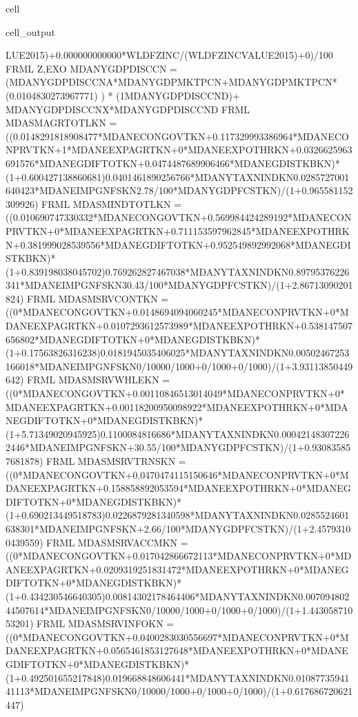 \documentclass[letterpaper,10pt,english]{jupyterBook}
\begin{document}
\begin{sphinxuseclass}{cell}
\begin{sphinxVerbatimOutput}
\begin{sphinxuseclass}{cell_output}
\begin{sphinxVerbatim}[commandchars=\\\{\}]
LUE\PYGZus{}2015)+0.000000000000*WLDFZINC/(WLDFZINC\PYGZus{}VALUE\PYGZus{}2015)+0)/100 \PYGZdl{}
FRML \PYGZlt{}Z,EXO\PYGZgt{} MDANYGDPDISCCN = (MDANYGDPDISCCN\PYGZus{}A*MDANYGDPMKTPCN+MDANYGDPMKTPCN* (\PYGZhy{}0.0104830273967771) ) * (1\PYGZhy{}MDANYGDPDISCCN\PYGZus{}D)+ MDANYGDPDISCCN\PYGZus{}X*MDANYGDPDISCCN\PYGZus{}D  \PYGZdl{}
FRML  \PYGZlt{}\PYGZgt{} MDASMAGRTOTLKN = ((0.0148291818908477*MDANECONGOVTKN+0.117329993386964*MDANECONPRVTKN+1*MDANEEXPAGRTKN+0*MDANEEXPOTHRKN+0.0326625963691576*MDANEGDIFTOTKN+0.0474487689906466*MDANEGDISTKBKN)*(1+0.600427138860681)\PYGZhy{}0.0401461890256766*MDANYTAXNINDKN\PYGZhy{}0.0285727001640423*MDANEIMPGNFSKN\PYGZhy{}2.78/100*MDANYGDPFCSTKN)/(1+0.965581152309926) \PYGZdl{}
FRML  \PYGZlt{}\PYGZgt{} MDASMINDTOTLKN = ((0.010690747330332*MDANECONGOVTKN+0.569984424289192*MDANECONPRVTKN+0*MDANEEXPAGRTKN+0.711153597962845*MDANEEXPOTHRKN+0.381999028539556*MDANEGDIFTOTKN+0.952549892992068*MDANEGDISTKBKN)*(1+0.839198038045702)\PYGZhy{}0.769262827467038*MDANYTAXNINDKN\PYGZhy{}0.89795376226341*MDANEIMPGNFSKN\PYGZhy{}30.43/100*MDANYGDPFCSTKN)/(1+2.86713090201824) \PYGZdl{}
FRML  \PYGZlt{}\PYGZgt{} MDASMSRVCONTKN = ((0*MDANECONGOVTKN+0.0148694094060245*MDANECONPRVTKN+0*MDANEEXPAGRTKN+0.0107293612573989*MDANEEXPOTHRKN+0.538147507656802*MDANEGDIFTOTKN+0*MDANEGDISTKBKN)*(1+0.17563826316238)\PYGZhy{}0.0181945035406025*MDANYTAXNINDKN\PYGZhy{}0.00502467253166018*MDANEIMPGNFSKN\PYGZhy{}0/1000\PYGZhy{}0/1000+0/1000+0/1000)/(1+3.93113850449642) \PYGZdl{}
FRML  \PYGZlt{}\PYGZgt{} MDASMSRVWHLEKN = ((0*MDANECONGOVTKN+0.00110846513014049*MDANECONPRVTKN+0*MDANEEXPAGRTKN+0.00118200950098922*MDANEEXPOTHRKN+0*MDANEGDIFTOTKN+0*MDANEGDISTKBKN)*(1+5.71349020945925)\PYGZhy{}0.1100084816686*MDANYTAXNINDKN\PYGZhy{}0.000421483072262446*MDANEIMPGNFSKN+30.55/100*MDANYGDPFCSTKN)/(1+0.930835857681878) \PYGZdl{}
FRML  \PYGZlt{}\PYGZgt{} MDASMSRVTRNSKN = ((0*MDANECONGOVTKN+0.0470474115150646*MDANECONPRVTKN+0*MDANEEXPAGRTKN+0.158858892053594*MDANEEXPOTHRKN+0*MDANEGDIFTOTKN+0*MDANEGDISTKBKN)*(1+0.690213449518783)\PYGZhy{}0.0226879281340598*MDANYTAXNINDKN\PYGZhy{}0.0285524601638301*MDANEIMPGNFSKN+2.66/100*MDANYGDPFCSTKN)/(1+2.45793100439559) \PYGZdl{}
FRML  \PYGZlt{}\PYGZgt{} MDASMSRVACCMKN = ((0*MDANECONGOVTKN+0.017042866672113*MDANECONPRVTKN+0*MDANEEXPAGRTKN+0.0209319251831472*MDANEEXPOTHRKN+0*MDANEGDIFTOTKN+0*MDANEGDISTKBKN)*(1+0.434230546640305)\PYGZhy{}0.00814302178464406*MDANYTAXNINDKN\PYGZhy{}0.00709480244507614*MDANEIMPGNFSKN\PYGZhy{}0/1000\PYGZhy{}0/1000+0/1000+0/1000)/(1+1.44305871053201) \PYGZdl{}
FRML  \PYGZlt{}\PYGZgt{} MDASMSRVINFOKN = ((0*MDANECONGOVTKN+0.0400283030556697*MDANECONPRVTKN+0*MDANEEXPAGRTKN+0.0565461853127648*MDANEEXPOTHRKN+0*MDANEGDIFTOTKN+0*MDANEGDISTKBKN)*(1+0.492501655217848)\PYGZhy{}0.019668848606441*MDANYTAXNINDKN\PYGZhy{}0.0108773594141113*MDANEIMPGNFSKN\PYGZhy{}0/1000\PYGZhy{}0/1000+0/1000+0/1000)/(1+0.617686720621447) \PYGZdl{}

\end{sphinxVerbatim}
\end{sphinxuseclass}
\end{sphinxVerbatimOutput}
\end{sphinxuseclass}
\end{document}
